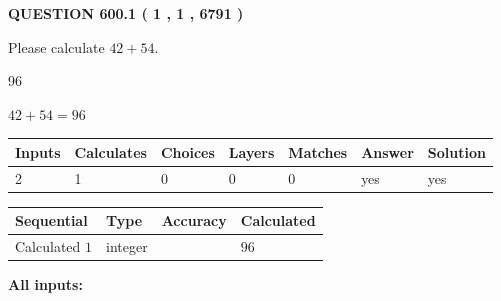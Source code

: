 \documentclass[12pt]{article}
\begin{document}
\vspace{0.2in}
  
{\textbf{\Large{QUESTION
600.1 
 ( 1 , 1 , 6791 )
}}}
  
  
 
Please calculate $ %
42 +  %
54 $.
 
 
 
\noindent{}
 
 

96
 
 
\noindent{}
 
 

 
 
 
\noindent{}
 
 

$ %
42 +  %
54=   %
96$
 
 
\noindent{}
 
 

 
   
   
   
   
\noindent\begin{tabular}{|l|l|l|l|l|l|l|}
 \hline
Inputs & Calculates & Choices & Layers & Matches & Answer & Solution \\ \hline
 2  & 
 1  & 
 0
  & 
 0  & 
 0  & 
  yes & 
  yes 
  \\ \hline
 \end{tabular}
   
   
   
   
\noindent{}
   
   
  
  
\noindent\begin{tabular}{|l|l|l|l|}
\hline
 Sequential & Type & Accuracy & Calculated \\ 
\hline
 
 
  Calculated $  1 $ & integer &  & 
  $ 96 $ 
 \\  \hline  
 \end{tabular}
   
   
   
   
\noindent\vspace{0.1in}\hspace{-0.08in} {\textbf{\Large{All inputs: }}}
   
\end{document}
